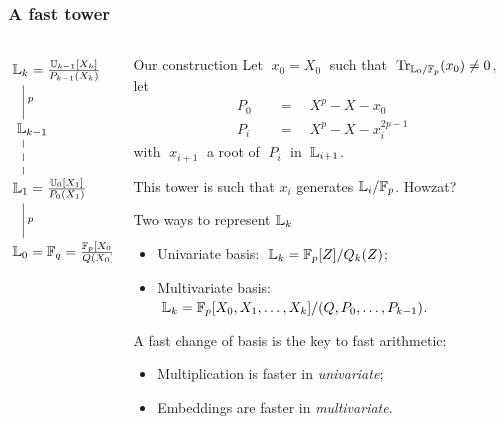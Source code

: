 \documentclass[10pt,usepdftitle=false]{beamer}
\begin{document}
\begin{frame}
  \frametitle{A fast tower}

  \vspace{-2mm}

  \begin{columns}
    \begin{column}{0.3\textwidth}
      \Large\[\xymatrix{
        *+[r]{\LK_k = \frac{\U_{k-1}[X_k]}{P_{k-1}(X_k)}}\ar@{-}[d]^p\\
        *+[r]{\LK_{k-1}} \ar@{--}[d]\\
        *+[r]{\LK_1 = \frac{\U_0[X_1]}{P_0(X_1)}} \ar@{-}[d]^p\\
        *+[r]{\LK_0 = \F_q = \frac{\F_p[X_0]}{Q(X_0)}}
      }\]
    \end{column}
    \begin{column}{0.65\textwidth}
      \begin{block}{Our construction}
        Let $\;x_0 = X_0\;$ such that
        $\;\operatorname{Tr}_{\mathbb{L}_0/\mathbb{F}_p}(x_0) \ne 0$, let
        \begin{align*}
          P_0 \quad&=\quad X^p - X - x_0\\
          P_i \quad&=\quad X^p - X - x_i^{2p-1}
        \end{align*}
        with $\;x_{i+1}\;$ a root of $\;P_i\;$ in $\;\mathbb{L}_{i+1}$.

        \alert{This tower is such that $x_i$ generates $\mathbb{L}_i/\mathbb{F}_p$.} Howzat?
      \end{block}

      \begin{block}{Two ways to represent $\mathbb{L}_k$}
        \begin{itemize}
        \item Univariate basis: $\;\mathbb{L}_k=\mathbb{F}_p[Z]/Q_k(Z)$;
        \item Multivariate basis: $\;\mathbb{L}_k=\mathbb{F}_p[X_0,X_1,\ldots,X_k]/(Q,P_0,\ldots,P_{k-1})$.
        \end{itemize}
        \alert{A fast change of basis is the key to fast arithmetic:}
        \begin{itemize}
        \item Multiplication is faster in \emph{univariate};
        \item Embeddings are faster in \emph{multivariate}.
        \end{itemize}
      \end{block}
    \end{column}
  \end{columns}
\end{frame}
\end{document}
